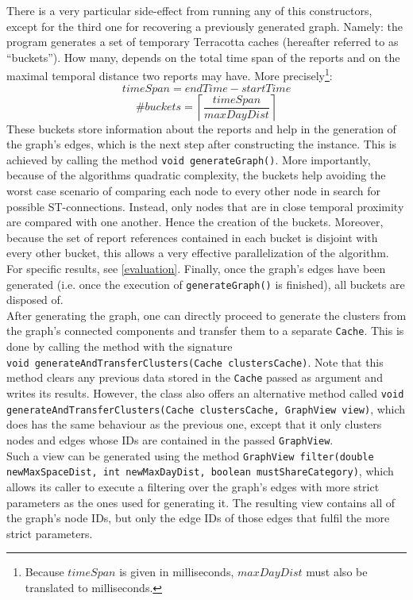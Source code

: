 \documentclass{article}
\begin{document}
		There is a very particular side-effect from running any of this constructors, except for the
		third one for recovering a previously generated graph. Namely: the program generates a set 
		of temporary Terracotta caches (hereafter referred to as ``buckets''). 
		How many, depends on the total time span of the reports and 
		on the maximal temporal distance two reports may have. More precisely\footnote{Because 
		$timeSpan$ is given in milliseconds, $maxDayDist$ must also be translated to
		milliseconds.}:
			$$timeSpan = endTime - startTime$$
			$$\#buckets = \left\lceil \frac{timeSpan}{maxDayDist} \right\rceil$$
		These buckets store information about the reports and help in the generation of the graph's
		edges, which is the next step after constructing the instance. This is achieved by calling the 
		method \texttt{void generateGraph()}. More importantly, because of the algorithms quadratic complexity,
		the buckets help avoiding the worst case scenario of comparing each node to every other node
		in search for possible ST-connections. Instead, only nodes that are in close temporal proximity
		are compared with one another. Hence the creation of the buckets. Moreover, because the set
		of report references contained in each bucket is disjoint with every other bucket, this allows 
		a very effective parallelization of the algorithm. For specific results, see \ref{evaluation}. 
		Finally, once the graph's edges have been generated (i.e. once the 
		execution of \texttt{generateGraph()} is finished), all buckets are disposed of.\\
		After generating the graph, one can directly proceed to generate the clusters from the 
		graph's connected components and transfer them to a separate \texttt{Cache}. This is done
		by calling the method with the signature \\
		\texttt{void generateAndTransferClusters(Cache clustersCache)}.	Note that this method 
		clears any previous data stored in the \texttt{Cache} passed as argument
		and writes its results. However, the class also offers an alternative method called 
		\texttt{void generateAndTransferClusters(Cache clustersCache, GraphView view)}, which does has
		the same behaviour as the previous one, except that it only clusters nodes and edges whose IDs are 
		contained in the passed \texttt{GraphView}.\\
		Such a view can be generated using the method \texttt{GraphView filter(double newMaxSpaceDist, 
		int newMaxDayDist, boolean mustShareCategory)}, which allows its caller to execute a filtering
		over the graph's edges with more strict parameters as the ones used for generating it. The
		resulting view contains all of the graph's node IDs, but only the edge IDs of those edges that 
		fulfil the more strict 	parameters.
	
\end{document}
